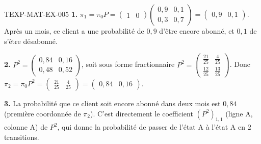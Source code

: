 \begin{corrige}{TEXP-MAT-EX-005}
\textbf{1.} $\pi_1=\pi_0P=\begin{pmatrix}1&0\end{pmatrix}\begin{pmatrix}0{,}9&0{,}1\\0{,}3&0{,}7\end{pmatrix}=\begin{pmatrix}0{,}9&0{,}1\end{pmatrix}$. Après un mois, ce client a une probabilité de $0{,}9$ d'être encore abonné, et $0{,}1$ de s'être désabonné.

\textbf{2.} $P^2=\begin{pmatrix}0{,}84&0{,}16\\0{,}48&0{,}52\end{pmatrix}$, soit sous forme fractionnaire $P^2=\begin{pmatrix}\tfrac{21}{25}&\tfrac{4}{25}\\\tfrac{12}{25}&\tfrac{13}{25}\end{pmatrix}$. Donc $\pi_2=\pi_0P^2=\begin{pmatrix}\tfrac{21}{25}&\tfrac{4}{25}\end{pmatrix}=\begin{pmatrix}0{,}84&0{,}16\end{pmatrix}$.

\textbf{3.} La probabilité que ce client soit encore abonné dans deux mois est $0{,}84$ (première coordonnée de $\pi_2$). C'est directement le coefficient $(P^2)_{1,1}$ (ligne A, colonne A) de $P^2$, qui donne la probabilité de passer de l'état A à l'état A en $2$ transitions.
\end{corrige}
